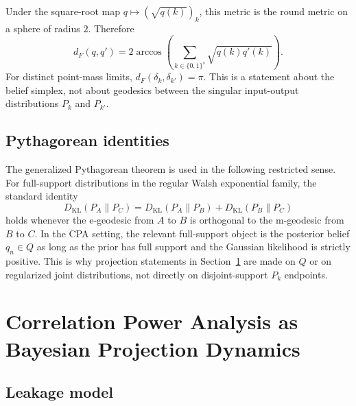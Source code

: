 \documentclass[referee,lineno,pdflatex,sn-mathphys-num]{sn-jnl}
\theoremstyle{thmstylethree}
\theoremstyle{thmstyletwo}
\theoremstyle{thmstyleone}
\newcommand{\KL}{D_{\mathrm{KL}}}
\newcommand{\B}[1]{\{0,1\}^{#1}}
\begin{document}
Under the square-root map $q\mapsto(\sqrt{q(k)})_k$, this metric is the round
metric on a sphere of radius $2$.  Therefore
\begin{equation}\label{eq:hellinger-angle}
  d_F(q,q')=2\arccos\left(\sum_{k\in\B{s}}\sqrt{q(k)q'(k)}\right).
\end{equation}
For distinct point-mass limits, $d_F(\delta_k,\delta_{k'})=\pi$.  This is a
statement about the belief simplex, not about geodesics between the singular
input-output distributions $P_k$ and $P_{k'}$.

\subsection{Pythagorean identities}\label{subsec:pythagorean}

The generalized Pythagorean theorem is used in the following restricted sense.
For full-support distributions in the regular Walsh exponential family, the
standard identity
\begin{equation}\label{eq:pythagorean-interior}
  \KL(P_A\|P_C)=\KL(P_A\|P_B)+\KL(P_B\|P_C)
\end{equation}
holds whenever the e-geodesic from $A$ to $B$ is orthogonal to the m-geodesic
from $B$ to $C$.  In the CPA setting, the relevant full-support object is the
posterior belief $q_n\in Q$ as long as the prior has full support and the
Gaussian likelihood is strictly positive.  This is why projection statements in
Section~\ref{sec:cpa} are made on $Q$ or on regularized joint distributions,
not directly on disjoint-support $P_k$ endpoints.

\section{Correlation Power Analysis as Bayesian Projection Dynamics}\label{sec:cpa}

\subsection{Leakage model}\label{subsec:adv-model}
\end{document}
